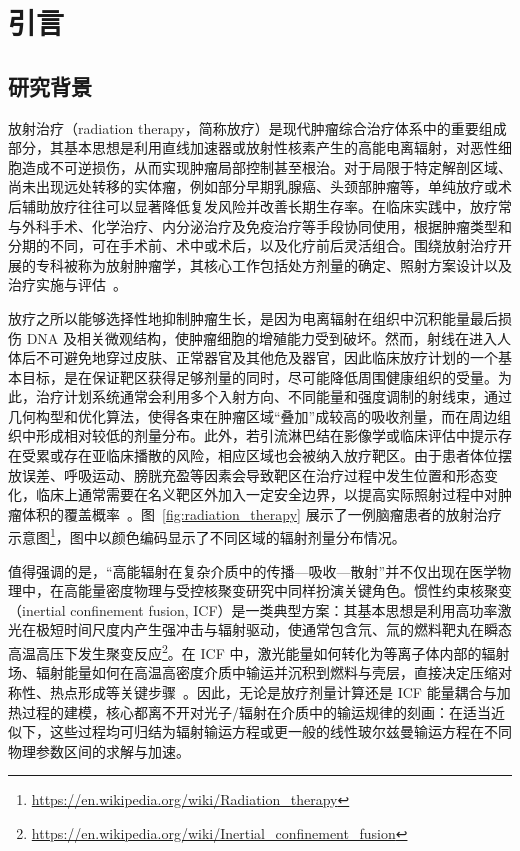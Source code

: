 \chapter{引言}

\section{研究背景}

放射治疗（radiation therapy，简称放疗）是现代肿瘤综合治疗体系中的重要组成部分，其基本思想是利用直线加速器或放射性核素产生的高能电离辐射，对恶性细胞造成不可逆损伤，从而实现肿瘤局部控制甚至根治。对于局限于特定解剖区域、尚未出现远处转移的实体瘤，例如部分早期乳腺癌、头颈部肿瘤等，单纯放疗或术后辅助放疗往往可以显著降低复发风险并改善长期生存率。在临床实践中，放疗常与外科手术、化学治疗、内分泌治疗及免疫治疗等手段协同使用，根据肿瘤类型和分期的不同，可在手术前、术中或术后，以及化疗前后灵活组合。围绕放射治疗开展的专科被称为放射肿瘤学，其核心工作包括处方剂量的确定、照射方案设计以及治疗实施与评估~\cite{maverakis2015metastatic, hendee2013radiation, khan2014khan, care2019radiation, bortfeld2011physical, baskar2012cancer}。

放疗之所以能够选择性地抑制肿瘤生长，是因为电离辐射在组织中沉积能量最后损伤 DNA 及相关微观结构，使肿瘤细胞的增殖能力受到破坏。然而，射线在进入人体后不可避免地穿过皮肤、正常器官及其他危及器官，因此临床放疗计划的一个基本目标，是在保证靶区获得足够剂量的同时，尽可能降低周围健康组织的受量。为此，治疗计划系统通常会利用多个入射方向、不同能量和强度调制的射线束，通过几何构型和优化算法，使得各束在肿瘤区域“叠加”成较高的吸收剂量，而在周边组织中形成相对较低的剂量分布。此外，若引流淋巴结在影像学或临床评估中提示存在受累或存在亚临床播散的风险，相应区域也会被纳入放疗靶区。由于患者体位摆放误差、呼吸运动、膀胱充盈等因素会导致靶区在治疗过程中发生位置和形态变化，临床上通常需要在名义靶区外加入一定安全边界，以提高实际照射过程中对肿瘤体积的覆盖概率~\cite{maverakis2015metastatic, hendee2013radiation}。图~\ref{fig:radiation_therapy} 展示了一例脑瘤患者的放射治疗示意图\footnote{\url{https://en.wikipedia.org/wiki/Radiation_therapy}}，图中以颜色编码显示了不同区域的辐射剂量分布情况。

值得强调的是，“高能辐射在复杂介质中的传播—吸收—散射”并不仅出现在医学物理中，在高能量密度物理与受控核聚变研究中同样扮演关键角色。惯性约束核聚变（inertial confinement fusion, ICF）是一类典型方案：其基本思想是利用高功率激光在极短时间尺度内产生强冲击与辐射驱动，使通常包含氘、氚的燃料靶丸在瞬态高温高压下发生聚变反应\footnote{\url{https://en.wikipedia.org/wiki/Inertial_confinement_fusion}}。在 ICF 中，激光能量如何转化为等离子体内部的辐射场、辐射能量如何在高温高密度介质中输运并沉积到燃料与壳层，直接决定压缩对称性、热点形成等关键步骤~\cite{makhijani2024entanglement}。因此，无论是放疗剂量计算还是 ICF 能量耦合与加热过程的建模，核心都离不开对光子/辐射在介质中的输运规律的刻画：在适当近似下，这些过程均可归结为辐射输运方程或更一般的线性玻尔兹曼输运方程在不同物理参数区间的求解与加速。

